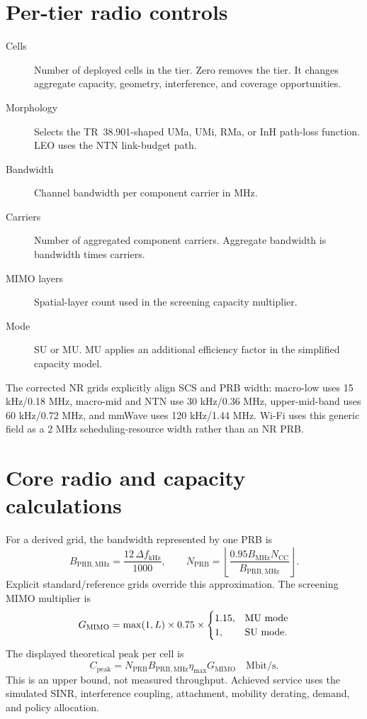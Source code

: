 \documentclass[10pt]{article}
\begin{document}
\section{Per-tier radio controls}
\begin{description}
  \item[Cells] Number of deployed cells in the tier. Zero removes the tier. It changes aggregate capacity, geometry, interference, and coverage opportunities.
  \item[Morphology] Selects the TR~38.901-shaped UMa, UMi, RMa, or InH path-loss function. LEO uses the NTN link-budget path.
  \item[Bandwidth] Channel bandwidth per component carrier in MHz.
  \item[Carriers] Number of aggregated component carriers. Aggregate bandwidth is bandwidth times carriers.
  \item[MIMO layers] Spatial-layer count used in the screening capacity multiplier.
  \item[Mode] SU or MU. MU applies an additional efficiency factor in the simplified capacity model.
\end{description}

The corrected NR grids explicitly align SCS and PRB width: macro-low uses 15 kHz/0.18 MHz, macro-mid and NTN use 30 kHz/0.36 MHz, upper-mid-band uses 60 kHz/0.72 MHz, and mmWave uses 120 kHz/1.44 MHz. Wi-Fi uses this generic field as a 2 MHz scheduling-resource width rather than an NR PRB.

\section{Core radio and capacity calculations}
For a derived grid, the bandwidth represented by one PRB is
\[
B_{\mathrm{PRB,MHz}}=\frac{12\,\Delta f_{\mathrm{kHz}}}{1000},\qquad
N_{\mathrm{PRB}}=\left\lfloor\frac{0.95 B_{\mathrm{MHz}}N_{\mathrm{CC}}}{B_{\mathrm{PRB,MHz}}}\right\rfloor .
\]
Explicit standard/reference grids override this approximation. The screening MIMO multiplier is
\[
G_{\mathrm{MIMO}}=\max(1,L)\times0.75\times
\begin{cases}1.15,&\text{MU mode}\cr1,&\text{SU mode.}\end{cases}
\]
The displayed theoretical peak per cell is
\[
C_{\mathrm{peak}}=N_{\mathrm{PRB}}B_{\mathrm{PRB,MHz}}\eta_{\max}G_{\mathrm{MIMO}}\quad\text{Mbit/s}.
\]
This is an upper bound, not measured throughput. Achieved service uses the simulated SINR, interference coupling, attachment, mobility derating, demand, and policy allocation.
\end{document}
